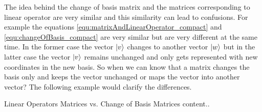 The idea behind the change of basis matrix and the matrices corresponding to linear operator are very similar and this similarity can lead to confusions. For example the equations \ref{equ:matrixAndLinearOperator_compact} and \ref{equ:changeOfBasis_compact} are very similar but are very different at the same time. In the former case the vector $ \ket{v} $ changes to another vector $ \ket{w} $ but in the latter case the vector $\ket{v} $ remains unchanged and only gets represented with new coordinates in the new basis. So when we can know that a matrix changes the basis only and keeps the vector unchanged or maps the vector into another vector? The following example would clarify the differences.

\begin{example}{Linear Operators Matrices vs. Change of Basis Matrices}
	content..
\end{example}






